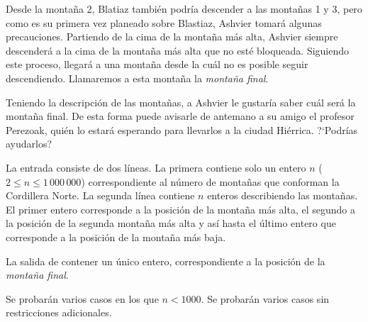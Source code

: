 \documentclass{oci}
\begin{document}
\begin{problemDescription}
Desde la montaña 2, Blatiaz también podría descender a las montañas 1 y 3,
pero como es su primera vez planeado sobre Blastiaz, Ashvier tomará algunas precauciones.
Partiendo de la cima de la montaña más alta, Ashvier siempre descenderá a la cima de la montaña más
alta que no esté bloqueada.
Siguiendo este proceso, llegará a una montaña desde la cuál no es posible seguir descendiendo.
Llamaremos a esta montaña la \emph{montaña final}.

Teniendo la descripción de las montañas, a Ashvier le gustaría saber cuál será la
montaña final.
De esta forma puede avisarle de antemano a su amigo el profesor Perezoak, quién lo estará
esperando para llevarlos a la ciudad Hiérrica.
?`Podrías ayudarlos?




\end{problemDescription}

\begin{inputDescription}

La entrada consiste de dos líneas.
La primera contiene solo un entero $n$ ($2 \leq n \leq 1\,000\,000$)
correspondiente al número de montañas que conforman la Cordillera Norte.
La segunda línea contiene $n$ enteros describiendo las montañas.
El primer entero corresponde a la posición de la montaña más alta, el segundo a la posición
de la segunda montaña más alta y así hasta el último entero que corresponde a la posición
de la montaña más baja.

\end{inputDescription}

\begin{outputDescription}
La salida de contener un único entero, correspondiente a la posición de la \emph{montaña final}.
\end{outputDescription}

\begin{scoreDescription}
  Se probarán varios casos en los que $n<1000$.
  Se probarán varios casos sin restricciones adicionales.
\end{scoreDescription}

\begin{sampleDescription}
\end{sampleDescription}
\end{document}
